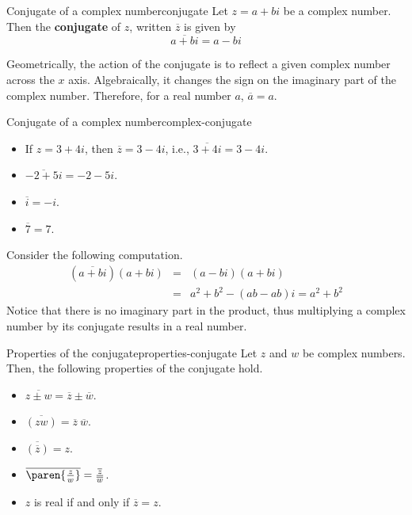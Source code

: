 \begin{definition}{Conjugate of a complex number}{conjugate}
  Let $z = a+bi$ be a complex number. Then the \textbf{conjugate} of $z$, written $\overline{z}$ is given by 
  \begin{equation*}
    \overline{a+bi}= a-bi
  \end{equation*}
\end{definition}

Geometrically, the action of the conjugate is to reflect a given complex number across the $x$ axis.
Algebraically, it changes the sign on the imaginary part of the complex number. Therefore, for a real number $a$, $\overline{a} = a$. 

\begin{example}{Conjugate of a complex number}{complex-conjugate}
  \begin{itemize}

  \item If $z=3+4i$, then $\overline{z}=3-4i$,
    i.e., $\overline{3+4i}=3-4i$.

  \item $\overline{-2+5i}= -2-5i$.

  \item $\overline{i}= -i$.

  \item $\overline{7}= 7$.
  \end{itemize}
\end{example}

Consider the following computation. 
\begin{eqnarray*}
  (\overline{a+bi}) (a+bi) &=&(a-bi)
                               (a+bi) \\
                           &=&a^{2}+b^{2}-(ab-ab)i =a^{2}+b^{2}
\end{eqnarray*}
Notice that there is no imaginary part in the product, thus
multiplying a complex number by its conjugate results in  a real number.

\begin{theorem}{Properties of the conjugate}{properties-conjugate}
  Let $z$ and $w$ be complex numbers. Then, the following properties of the conjugate hold.

  \begin{itemize}
  \item
    $\overline{z\pm w} = \overline{z} \pm \overline{w}$.
  \item
    $\overline{(zw)} = \overline{z}~ \overline{w}$.
  \item
    $\overline{(\overline{z})}=z$.
  \item
    $\overline{\paren{\frac{z}{w}}} =
    \frac{\overline{z}}{\overline{w}}$.
  \item
    $z$ is real if and only if $\overline{z}=z$.
  \end{itemize}
\end{theorem}

